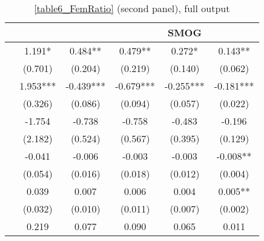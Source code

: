 \begin{table}
    \footnotesize
    \centering
    \begin{threeparttable}
        \caption{\autoref{table6_FemRatio} (second panel), full output}
        \label{table6_change_full}
        \begin{tabular}{p{3cm}S@{}S@{}S@{}S@{}S@{}}
            \toprule
            &{}&{}&{}&{SMOG}&{}\\
            \midrule
                  &       1.191*  &       0.484** &       0.479** &       0.272*  &       0.143** \\
                                          &     (0.701)   &     (0.204)   &     (0.219)   &     (0.140)   &     (0.062)   \\
                  &       1.953***&      -0.439***&      -0.679***&      -0.255***&      -0.181***\\
                                          &     (0.326)   &     (0.086)   &     (0.094)   &     (0.057)   &     (0.022)   \\
            &      -1.754   &      -0.738   &      -0.758   &      -0.483   &      -0.196   \\
                                          &     (2.182)   &     (0.524)   &     (0.567)   &     (0.395)   &     (0.129)   \\
                    &      -0.041   &      -0.006   &      -0.003   &      -0.003   &      -0.008** \\
                                          &     (0.054)   &     (0.016)   &     (0.018)   &     (0.012)   &     (0.004)   \\
                    &       0.039   &       0.007   &       0.006   &       0.004   &       0.005** \\
                                          &     (0.032)   &     (0.010)   &     (0.011)   &     (0.007)   &     (0.002)   \\
                       &       0.219   &       0.077   &       0.090   &       0.065   &       0.011   \\

\end{tabular}
\end{threeparttable}
\end{table}
